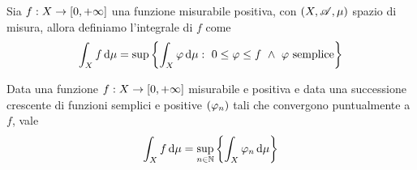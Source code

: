 \begin{definition}\label{def:IntegralePositive}
	Sia $f:X\to[0,+\infty]$ una funzione misurabile positiva, con $(X,\mathscr A,\mu)$ spazio di misura, allora definiamo l'integrale di $f$ come
	\begin{equation*}
		\int_Xf\de\mu=\sup\left\{\int_X\simp\de \mu:\ 0\le \simp\le f\ \wedge\ \simp \text{ semplice}\right\}
	\end{equation*}
\end{definition}

\begin{proposition} \label{DefinizioneEquivalenteIntegralePositive}
	Data una funzione $f:X\to[0,+\infty]$ misurabile e positiva e data una successione crescente di funzioni semplici e positive $(\varphi_n)$ tali che convergono puntualmente a $f$, vale 
	\begin{equation*}
		\int_X f\,\mathrm d\mu=\sup_{n\in\mathbb N}\left\{\int_X\varphi_n\,\mathrm d\mu\right\}
	\end{equation*}
\end{proposition}

